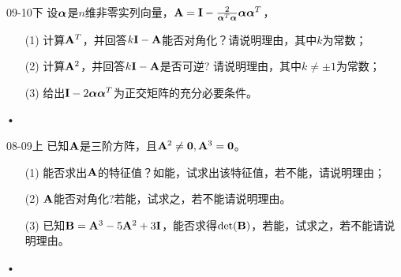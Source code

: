 \begin{frame} 
  \begin{footnotesize}
 


 \begin{exampleblock}{09-10下}     
     设$\boldsymbol{\alpha}$是$n$维非零实列向量，$\mathbf{A}=\mathbf{I}-\frac2{\boldsymbol{\alpha}^T\boldsymbol{\alpha}}\boldsymbol{\alpha}\boldsymbol{\alpha}^T$，
\begin{itemize}
\item[(1)] 计算$\mathbf{A}^T$，并回答$k\mathbf{I}-\mathbf{A}$能否对角化？请说明理由，其中$k$为常数；
\item[(2)] 计算$\mathbf{A}^2$，并回答$k\mathbf{I}-\mathbf{A}$是否可逆? 请说明理由，其中$k\ne\pm 1$为常数；
\item[(3)] 给出$\mathbf{I}-2\boldsymbol{\alpha}\boldsymbol{\alpha}^T$为正交矩阵的充分必要条件。
\end{itemize}•
    \end{exampleblock}



 \begin{exampleblock}{08-09上}     
     已知$\mathbf{A}$是三阶方阵，且$\mathbf{A}^2\ne \mathbf{0}, \mathbf{A}^3=\mathbf{0}$。
\begin{itemize}
\item[(1)] 能否求出$\mathbf{A}$的特征值？如能，试求出该特征值，若不能，请说明理由；
\item[(2)] $\mathbf{A}$能否对角化?若能，试求之，若不能请说明理由。
\item[(3)] 已知$\mathbf{B}=\mathbf{A}^3-5\mathbf{A}^2+3\mathbf{I}$，能否求得$\det(\mathbf{B})$，若能，试求之，若不能请说明理由。

\end{itemize}•
    \end{exampleblock}

 \end{footnotesize}
\end{frame}



